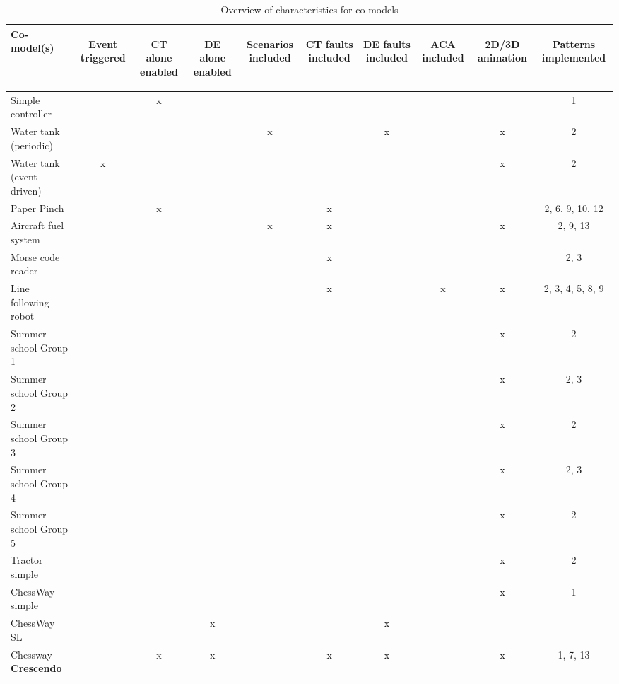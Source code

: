 \documentclass{crescendorepchap}
\newcommand{\DESTECS}{\textbf{Crescendo}\xspace}
\begin{document}
\begin{table}[!h]
\begin{centering}
\begin{tabular}{|l|c|c|c|c|c|c|c|c|c|}\hline
Co-model(s)
&\begin{sideways}Event triggered\end{sideways}
&\begin{sideways}CT alone enabled\end{sideways}
&\begin{sideways}DE alone enabled\end{sideways}
&\begin{sideways}Scenarios included\end{sideways}
&\begin{sideways}CT faults included\end{sideways}
&\begin{sideways}DE faults included\end{sideways}
&\begin{sideways}ACA included\end{sideways}
&\begin{sideways}2D/3D animation\end{sideways}
&\begin{sideways}Patterns implemented\end{sideways} \\
\hline
Simple controller       & &x& & & & & & & 1\\ \hline
Water tank (periodic)  	 & & & &x& &x& &x &2 \\ \hline
Water tank (event-driven)&x& & & & & & &x &2 \\ \hline
Paper Pinch              & &x & & &x& & & &2, 6, 9, 10, 12\\ \hline
Aircraft fuel system     & & & &x&x& & &x & 2, 9, 13\\ \hline
Morse code reader        & & & & &x& & & &2, 3 \\ \hline
Line following robot     & & & & &x& &x&x &2, 3, 4, 5, 8, 9\\ \hline
Summer school Group 1    & & & & & & & &x &2\\ \hline
Summer school Group 2    & & & & & & & &x &2, 3\\ \hline
Summer school Group 3    & & & & & & & &x &2 \\ \hline
Summer school Group 4    & & & & & & & &x &2, 3 \\ \hline
Summer school Group 5    & & & & & & & &x &2 \\ \hline
Tractor simple           & & & & & & & &x&2 \\ \hline
ChessWay simple          & & & & & & & &x &1\\ \hline
ChessWay SL              & & &x & & &x & & & \\ \hline
Chessway \DESTECS         & &x &x& &x&x& &x &1, 7, 13 \\ \hline
\end{tabular}
\caption{Overview of characteristics for co-models\label{tab:characteristics}}
\end{centering}
\end{table}
\end{document}

